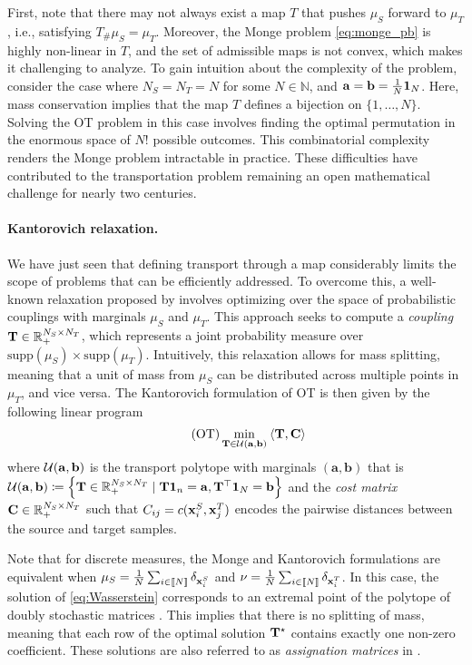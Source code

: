 First, note that there may not always exist a map \(T\) that pushes \(\mu_S\) forward to \(\mu_T\), i.e., satisfying \(T_{\#}\mu_S = \mu_T\). Moreover, the Monge problem \eqref{eq:monge_pb} is highly non-linear in \(T\), and the set of admissible maps is not convex, which makes it challenging to analyze. To gain intuition about the complexity of the problem, consider the case where \(N_S = N_T = N\) for some \(N \in \mathbb{N}\), and \({\mathbf{a}} = {\mathbf{b}} = \frac{1}{N} \mathbf{1}_N\). Here, mass conservation implies that the map \(T\) defines a bijection on \(\{1, \ldots, N\}\). Solving the OT problem in this case involves finding the optimal permutation in the enormous space of \(N!\) possible outcomes. This combinatorial complexity renders the Monge problem intractable in practice. These difficulties have contributed to the transportation problem remaining an open mathematical challenge for nearly two centuries.


\paragraph{Kantorovich relaxation.}
We have just seen that defining transport through a map considerably limits the scope of problems that can be efficiently addressed. To overcome this, a well-known relaxation proposed by \citep{kantorovich1942translocation} involves optimizing over the space of probabilistic couplings with marginals \(\mu_S\) and \(\mu_T\). This approach seeks to compute a \emph{coupling} \({\mathbf{T}} \in \mathbb{R}_{+}^{N_S \times N_T}\), which represents a joint probability measure over \(\text{supp}(\mu_S) \times \text{supp}(\mu_T)\). Intuitively, this relaxation allows for mass splitting, meaning that a unit of mass from \(\mu_S\) can be distributed across multiple points in \(\mu_T\), and vice versa.
The Kantorovich formulation of OT is then given by the following linear program
\begin{equation}
    \tag{OT}
    \label{eq:OT}
    \min_{{\mathbf{T}} \in {\mathcal{U}}({\mathbf{a}}, {\mathbf{b}})} \: \langle {\mathbf{T}}, {\mathbf{C}} \rangle
\end{equation}
where ${\mathcal{U}}({\mathbf{a}}, {\mathbf{b}})$ is the transport polytope with marginals $(\bm{a}, \bm{b})$ that is ${\mathcal{U}}({\mathbf{a}}, {\mathbf{b}}) \coloneqq \left\{ {\mathbf{T}} \in \mathbb{R}_+^{N_S \times N_T} \mid {\mathbf{T}} \mathbf{1}_n = {\mathbf{a}}, {\mathbf{T}}^\top \mathbf{1}_N = {\mathbf{b}} \right\}$ and the \emph{cost matrix} $\mathbf{C} \in \mathbb{R}_+^{N_S \times N_T}$ such that $C_{ij} = c({\mathbf{x}}_i^S, {\mathbf{x}}_j^T)$ encodes the pairwise distances between the source and target samples. 

Note that for discrete measures, the Monge and Kantorovich formulations are equivalent when $\mu_S = \frac{1}{N} \sum_{i \in {[\![N]\!]}} \delta_{{\mathbf{x}}^S_i}$ and $\nu = \frac{1}{N} \sum_{i \in {[\![N]\!]}} \delta_{{\mathbf{x}}^T_i}$. In this case, the solution of \eqref{eq:Wasserstein} corresponds to an extremal point of the polytope of doubly stochastic matrices \citep{bertsimas1997introduction}. This implies that there is no splitting of mass, meaning that each row of the optimal solution ${\mathbf{T}}^\star$ contains exactly one non-zero coefficient. These solutions are also referred to as \emph{assignation matrices} in .

